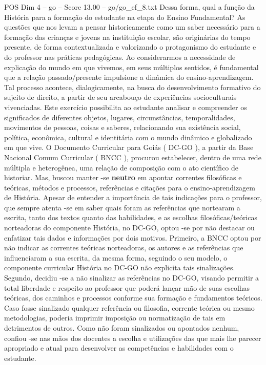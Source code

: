 \begin{textsample}{POS Dim 4 – go – Score 13.00 – go/go\_ef\_8.txt}
Dessa forma, qual a função da História para a formação do estudante na etapa do Ensino Fundamental?
As questões que nos levam a pensar historicamente como um saber necessário para a formação das crianças e jovens na instituição escolar, são originárias do tempo presente, de forma contextualizada e valorizando o protagonismo do estudante e do professor nas práticas pedagógicas.
Ao considerarmos a necessidade de explicação do mundo em que vivemos, em seus múltiplos sentidos, é fundamental que a relação passado/presente impulsione a dinâmica do ensino-aprendizagem.
Tal processo acontece, dialogicamente, na busca do desenvolvimento formativo do sujeito de direito, a partir de seu arcabouço de experiências socioculturais vivenciadas.
Este exercício possibilita ao estudante analisar e compreender os significados de diferentes objetos, lugares, circunstâncias, temporalidades, movimentos de pessoas, coisas e saberes, relacionando sua existência social, política, econômica, cultural e identitária com o mundo dinâmico e globalizado em que vive.
O Documento Curricular para Goiás ( DC-GO ), a partir da Base Nacional Comum Curricular ( BNCC ), procurou estabelecer, dentro de uma rede múltipla e heterogênea, uma relação de composição com o ato científico de historiar.
Mas, buscou manter -se \textbf{neutro} em apontar correntes filosóficas e teóricas, métodos e processos, referências e citações para o ensino-aprendizagem de História.
Apesar de entender a importância de tais indicações para o professor, que sempre atenta -se em saber quais foram as referências que nortearam a escrita, tanto dos textos quanto das habilidades, e as escolhas filosóficas/teóricas norteadoras do componente História, no DC-GO, optou -se por não destacar ou enfatizar tais dados e informações por dois motivos.
Primeiro, a BNCC optou por não indicar as correntes teóricas norteadoras, os autores e as referências que influenciaram a sua escrita, da mesma forma, seguindo o seu modelo, o componente curricular História no DC-GO não explicita tais sinalizações.
Segundo, decidiu -se a não sinalizar as referências no DC-GO, visando permitir a total liberdade e respeito ao professor que poderá lançar mão de suas escolhas teóricas, dos caminhos e processos conforme sua formação e fundamentos teóricos.
Caso fosse sinalizado qualquer referência ou filosofia, corrente teórica ou mesmo metodologias, poderia imprimir imposição ou normatização de tais em detrimentos de outros.
Como não foram sinalizados ou apontados nenhum, confiou -se nas mãos dos docentes a escolha e utilizações das que mais lhe parecer apropriado e atual para desenvolver as competências e habilidades com o estudante.

\end{textsample}
